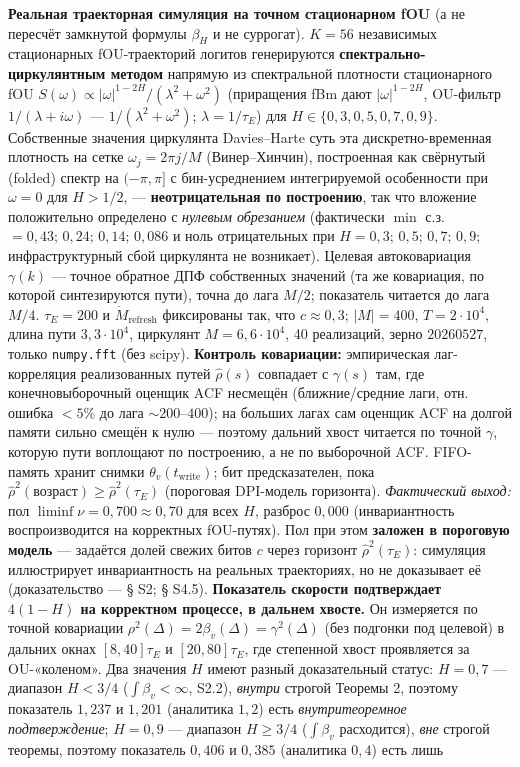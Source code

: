\documentclass[12pt]{iopart}
\begin{document}
\textbf{Реальная траекторная симуляция на точном стационарном fOU} (а не пересчёт замкнутой формулы \(\beta_H\) и не суррогат). \(K = 56\) независимых стационарных fOU-траекторий логитов генерируются \textbf{спектрально-циркулянтным методом} напрямую из спектральной плотности стационарного fOU \(S(\omega) \propto |\omega|^{1-2H}/(\lambda^2+\omega^2)\) (приращения fBm дают \(|\omega|^{1-2H}\), OU-фильтр \(1/(\lambda+i\omega)\) --- \(1/(\lambda^2+\omega^2)\); \(\lambda = 1/\tau_E\)) для \(H \in \{0{,}3, 0{,}5, 0{,}7, 0{,}9\}\). Собственные значения циркулянта Davies--Harte суть эта дискретно-временная плотность на сетке \(\omega_j = 2\pi j/M\) (Винер--Хинчин), построенная как свёрнутый (folded) спектр на \((-\pi,\pi]\) с бин-усреднением интегрируемой особенности при \(\omega = 0\) для \(H > 1/2\), --- \textbf{неотрицательная по построению}, так что вложение положительно определено с \emph{нулевым обрезанием} (фактически \(\min\) с.з. \(= 0{,}43;\,0{,}24;\,0{,}14;\,0{,}086\) и ноль отрицательных при \(H = 0{,}3;\,0{,}5;\,0{,}7;\,0{,}9\); инфраструктурный сбой циркулянта не возникает). Целевая автоковариация \(\gamma(k)\) --- точное обратное ДПФ собственных значений (та же ковариация, по которой синтезируются пути), точна до лага \(M/2\); показатель читается до лага \(M/4\). \(\tau_E = 200\) и \(\dot M_{\text{refresh}}\) фиксированы так, что \(c \approx 0{,}3\); \(|M| = 400\), \(T = 2\cdot10^4\), длина пути \(3{,}3\cdot10^4\), циркулянт \(M = 6{,}6\cdot10^4\), 40 реализаций, зерно \(20260527\), только \texttt{numpy.fft} (без scipy). \textbf{Контроль ковариации:} эмпирическая лаг-корреляция реализованных путей \(\hat\rho(s)\) совпадает с \(\gamma(s)\) там, где конечновыборочный оценщик ACF несмещён (ближние/средние лаги, отн. ошибка \(<5\%\) до лага \(\sim200\text{–}400\)); на больших лагах сам оценщик ACF на долгой памяти сильно смещён к нулю --- поэтому дальний хвост читается по точной \(\gamma\), которую пути воплощают по построению, а не по выборочной ACF. FIFO-память хранит снимки \(\theta_v(t_{\text{write}})\); бит предсказателен, пока \(\hat\rho^2(\text{возраст}) \ge \hat\rho^2(\tau_E)\) (пороговая DPI-модель горизонта). \emph{Фактический выход:} пол \(\liminf\nu = 0{,}700 \approx 0{,}70\) для всех \(H\), разброс \(0{,}000\) (инвариантность воспроизводится на корректных fOU-путях). Пол при этом \textbf{заложен в пороговую модель} --- задаётся долей свежих битов \(c\) через горизонт \(\hat\rho^2(\tau_E)\): симуляция иллюстрирует инвариантность на реальных траекториях, но не доказывает её (доказательство --- § S2; § S4.5). \textbf{Показатель скорости подтверждает \(4(1-H)\) на корректном процессе, в дальнем хвосте.} Он измеряется по точной ковариации \(\rho^2(\Delta) = 2\beta_v(\Delta) = \gamma^2(\Delta)\) (без подгонки под целевой) в дальних окнах \([8,40]\tau_E\) и \([20,80]\tau_E\), где степенной хвост проявляется за OU-«коленом». Два значения \(H\) имеют разный доказательный статус: \(H = 0{,}7\) --- диапазон \(H < 3/4\) (\(\int\beta_v < \infty\), S2.2), \emph{внутри} строгой Теоремы 2, поэтому показатель \(1{,}237\) и \(1{,}201\) (аналитика \(1{,}2\)) есть \emph{внутритеоремное подтверждение}; \(H = 0{,}9\) --- диапазон \(H \ge 3/4\) (\(\int\beta_v\) расходится), \emph{вне} строгой теоремы, поэтому показатель \(0{,}406\) и \(0{,}385\) (аналитика \(0{,}4\)) есть лишь 
\end{document}
